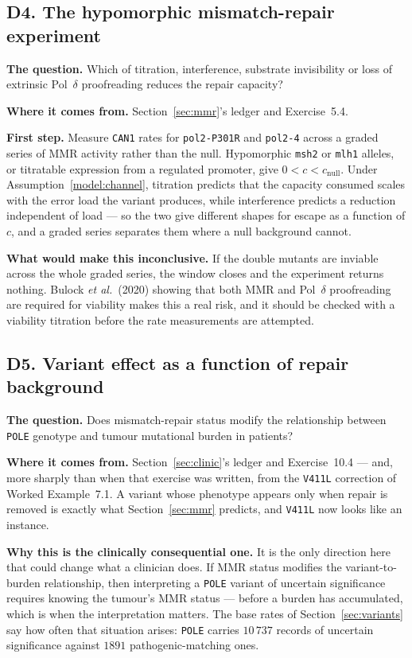 \subsection*{D4. The hypomorphic mismatch-repair experiment}

\textbf{The question.} Which of titration, interference, substrate invisibility
or loss of extrinsic Pol~$\delta$ proofreading reduces the repair capacity?

\textbf{Where it comes from.} Section~\ref{sec:mmr}'s ledger and
Exercise~5.4.

\textbf{First step.} Measure \texttt{CAN1} rates for \texttt{pol2-P301R} and
\texttt{pol2-4} across a graded series of MMR activity rather than the null.
Hypomorphic \texttt{msh2} or \texttt{mlh1} alleles, or titratable expression from
a regulated promoter, give $0 < c < c_{\mathrm{null}}$. Under
Assumption~\ref{model:channel}, titration predicts that the capacity consumed
scales with the error load the variant produces, while interference predicts a
reduction independent of load --- so the two give different shapes for escape as
a function of $c$, and a graded series separates them where a null background
cannot.

\textbf{What would make this inconclusive.} If the double mutants are inviable
across the whole graded series, the window closes and the experiment returns
nothing. Bulock \emph{et al.}\ (2020) showing that both MMR and Pol~$\delta$
proofreading are required for viability makes this a real risk, and it should be
checked with a viability titration before the rate measurements are attempted.

\subsection*{D5. Variant effect as a function of repair background}

\textbf{The question.} Does mismatch-repair status modify the relationship
between \texttt{POLE} genotype and tumour mutational burden in patients?

\textbf{Where it comes from.} Section~\ref{sec:clinic}'s ledger and
Exercise~10.4 --- and, more sharply than when that exercise was written, from
the \texttt{V411L} correction of Worked Example~7.1. A variant whose phenotype
appears only when repair is removed is exactly what Section~\ref{sec:mmr}
predicts, and \texttt{V411L} now looks like an instance.

\textbf{Why this is the clinically consequential one.} It is the only direction
here that could change what a clinician does. If MMR status modifies the
variant-to-burden relationship, then interpreting a \texttt{POLE} variant of
uncertain significance requires knowing the tumour's MMR status --- before a
burden has accumulated, which is when the interpretation matters. The base rates
of Section~\ref{sec:variants} say how often that situation arises: \texttt{POLE}
carries $10\,737$ records of uncertain significance against $1891$
pathogenic-matching ones.

